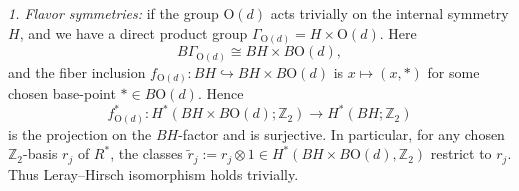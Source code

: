 \documentclass[aps,prx,reprint,superscriptaddress,twocolumn,amsmath,amssymb,amsfonts, nofootinbib]{revtex4-2}
\theoremstyle{apsstyle}
\begin{document}
\textit{1. Flavor symmetries:} if the group $\mathrm{O}(d)$ acts trivially on the internal symmetry $H$, and we have a direct product group $\Gamma_{\mathrm{O}(d)}= H\times \mathrm{O}(d)$. Here 
\begin{equation*}
B\Gamma_{\mathrm{O}(d)}\cong BH\times B\mathrm{O}(d),
\end{equation*} 
and the fiber inclusion $f_{\mathrm{O}(d)}:BH\hookrightarrow BH\times B\mathrm{O}(d)$ is $x\mapsto (x,*)$ for some chosen base-point $*\in B\mathrm{O}(d)$. Hence 
\begin{equation*}
f_{\mathrm{O}(d)}^{*}:H^{*}(BH\times B\mathrm{O}(d);\mathbb Z_2)\to H^{*}(BH;\mathbb Z_2)  
\end{equation*}
is the projection on the $BH$-factor and is surjective. In particular, for any chosen $\mathbb Z_2$-basis ${r_j}$ of $R^{*}$, the classes $\widetilde{r}_j:=r_j\otimes 1\in H^{*}(BH\times B\mathrm{O}(d),\mathbb Z_2)$ restrict to $r_j$. Thus Leray–Hirsch isomorphism holds trivially.

\bigskip
 
\end{document}
